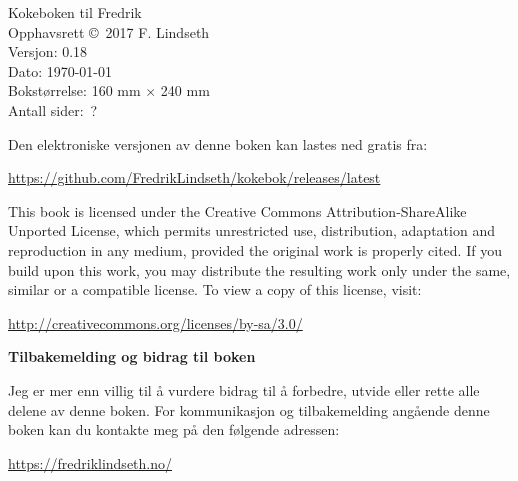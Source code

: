 
\setcounter{page}{1}

{\footnotesize
\noindent
Kokeboken til Fredrik\\
Opphavsrett \copyright~2017 F. Lindseth\\
Versjon: 0.18 \\
Dato: \today{}\\
Bokstørrelse: 160 mm $\times$ 240 mm\\
Antall sider:~?\\
\vspace{20pt}

\noindent
Den elektroniske versjonen av denne boken kan lastes ned gratis fra:

\noindent
\url{https://github.com/FredrikLindseth/kokebok/releases/latest}

\vspace{15pt}

\noindent

\noindent
This book is licensed under the Creative Commons Attribution-ShareAlike Unported License, which permits unrestricted use, distribution, adaptation and reproduction in any medium, provided the original work is properly cited. If you build upon this work, you may distribute the resulting work only under the same, similar or a compatible license. To view a copy of this license, visit:

\noindent
\url{http://creativecommons.org/licenses/by-sa/3.0/}
\vspace{25pt}

\noindent
{\sffamily\bfseries Tilbakemelding og bidrag til boken}

\noindent
Jeg er mer enn villig til å vurdere bidrag til å forbedre, utvide eller rette alle delene av denne boken.
For kommunikasjon og tilbakemelding angående denne boken kan du kontakte meg på den følgende adressen:

\noindent
\url{https://fredriklindseth.no/}\\

\vfill
\noindent


} %
